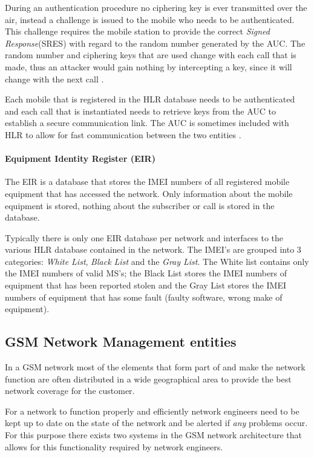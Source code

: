 During an authentication procedure no ciphering key is ever transmitted over the air, instead a challenge is issued to the mobile who needs to be authenticated. This challenge requires the mobile station to provide the correct \emph{Signed Response}(SRES) with regard to the random number generated by the AUC\cite{GSM92,GSMSysEngin}. The random number and ciphering keys that are used change with each call that is made, thus an attacker would gain nothing by intercepting a key, since it will change with the next call \cite{GSMSysEngin}.

Each mobile that is registered in the HLR database needs to be authenticated and each call that is instantiated needs to retrieve keys from the AUC to establish a secure communication link\cite{GSM92,GSMSysEngin}. The AUC is sometimes included with HLR to allow for fast communication between the two entities \cite{GSMSysEngin}.

\paragraph{Equipment Identity Register (EIR)}
The EIR is a database that stores the IMEI numbers of all registered mobile equipment that has accessed the network. Only information about the mobile equipment is stored, nothing about the subscriber or call is stored in the database.

Typically there is only one EIR database per network and interfaces to the various HLR database contained in the network. The IMEI's are grouped into 3 categories: \emph{White List}, \emph{Black List} and the \emph{Gray List}. The White list contains only the IMEI numbers of valid MS's; the Black List stores the IMEI numbers of equipment that has been reported stolen and the Gray List stores the IMEI numbers of equipment that has some fault (faulty software, wrong make of equipment).

\subsection{GSM Network Management entities}
In a GSM network most of the elements that form part of and make the network function are often distributed in a wide geographical area to provide the best network coverage for the customer. 

For a network to function properly and efficiently network engineers need to be kept up to date on the state of the network and be alerted if \emph{any} problems occur. For this purpose there exists two systems in the GSM network architecture that allows for this functionality required by network engineers. 

